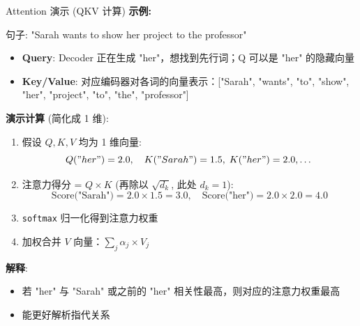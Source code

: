 \documentclass{beamer}
\begin{document}
\begin{frame}{Attention 演示 (QKV 计算)}
  \textbf{示例:}
  \begin{block}{}
    句子: "Sarah wants to show her project to the professor"
  \end{block}
  \begin{itemize}
    \item \textbf{Query}: Decoder 正在生成 "her"，想找到先行词；Q 可以是 "her" 的隐藏向量
    \item \textbf{Key/Value}: 对应编码器对各词的向量表示：["Sarah", "wants", "to", "show", "her", "project", "to", "the", "professor"]
  \end{itemize}
  \vspace{1em}
  \textbf{演示计算} (简化成 1 维):
  \begin{enumerate}
    \item 假设 $Q, K, V$ 均为 1 维向量:
      \[
        Q("her") = 2.0, \quad K("Sarah")=1.5, \; K("her")=2.0, \dots
      \]
    \item 注意力得分 = $Q \times K$ (再除以 $\sqrt{d_k}$, 此处 $d_k=1$):
      \[
        \text{Score("Sarah")} = 2.0 \times 1.5 = 3.0, \quad
        \text{Score("her")} = 2.0 \times 2.0 = 4.0
      \]
    \item \texttt{softmax} 归一化得到注意力权重
    \item 加权合并 $V$ 向量：$\sum_j \alpha_j \times V_j$
  \end{enumerate}
  \vspace{1em}
  \textbf{解释}:
  \begin{itemize}
    \item 若 "her" 与 "Sarah" 或之前的 "her" 相关性最高，则对应的注意力权重最高
    \item 能更好解析指代关系
  \end{itemize}
\end{frame}
\end{document}
